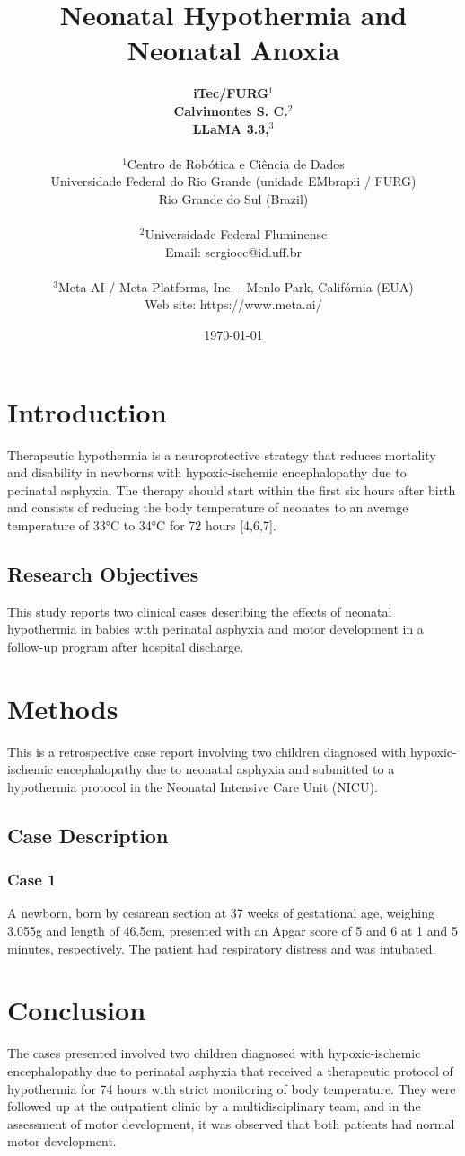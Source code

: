 \documentclass[11pt,a4paper]{article}
\title{\textbf{Neonatal Hypothermia and Neonatal Anoxia}}
\author{
	\textbf{iTec/FURG}$^{1}$ \\
	\textbf{Calvimontes S. C.}$^{2}$ \\
	\textbf{LLaMA 3.3,}$^{3}$ \\
	\\
	\small $^{1}$Centro de Robótica e Ciência de Dados \\
	\small Universidade Federal do Rio Grande (unidade EMbrapii / FURG) \\
	\small Rio Grande do Sul (Brazil) \\
	\\
	\small $^{2}$Universidade Federal Fluminense \\
	\small Email: sergiocc@id.uff.br \\
	\\
	\small $^{3}$Meta AI / Meta Platforms, Inc. - Menlo Park, Califórnia (EUA) \\
	\small Web site: https://www.meta.ai/
}
\date{\today}
\begin{document}
	
	\maketitle
	
	\newpage
	
	\section{Introduction}
	Therapeutic hypothermia is a neuroprotective strategy that reduces mortality and disability in newborns with hypoxic-ischemic encephalopathy due to perinatal asphyxia. The therapy should start within the first six hours after birth and consists of reducing the body temperature of neonates to an average temperature of 33°C to 34°C for 72 hours [4,6,7].
		
	\subsection{Research Objectives}
	This study reports two clinical cases describing the effects of neonatal hypothermia in babies with perinatal asphyxia and motor development in a follow-up program after hospital discharge.
	
	\section{Methods}
	This is a retrospective case report involving two children diagnosed with hypoxic-ischemic encephalopathy due to neonatal asphyxia and submitted to a hypothermia protocol in the Neonatal Intensive Care Unit (NICU).
	
	\subsection{Case Description}
	\subsubsection{Case 1}
	A newborn, born by cesarean section at 37 weeks of gestational age, weighing 3.055g and length of 46.5cm, presented with an Apgar score of 5 and 6 at 1 and 5 minutes, respectively. The patient had respiratory distress and was intubated.
		
	\section{Conclusion}
	The cases presented involved two children diagnosed with hypoxic-ischemic encephalopathy due to perinatal asphyxia that received a therapeutic protocol of hypothermia for 74 hours with strict monitoring of body temperature. They were followed up at the outpatient clinic by a multidisciplinary team, and in the assessment of motor development, it was observed that both patients had normal motor development.
	
	\newpage
	
	\printbibliography[title=References]
		
\end{document}
